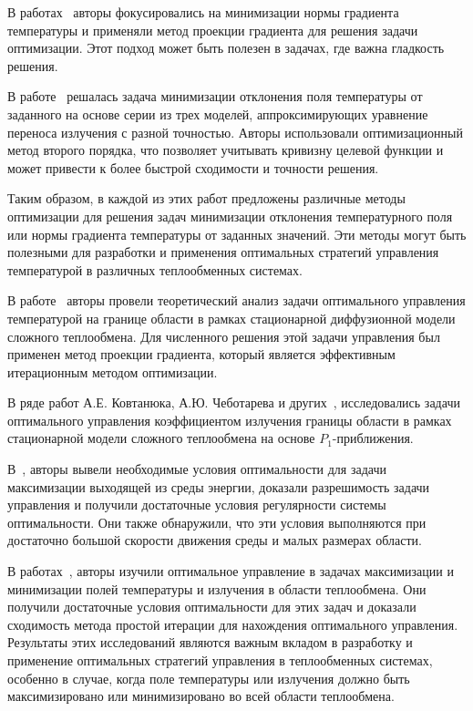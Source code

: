 В работах~\cite{clever2012optimal, Pinnau2013} авторы фокусировались на минимизации
нормы градиента температуры и применяли метод проекции градиента для решения задачи оптимизации.
Этот подход может быть полезен в задачах, где важна гладкость решения.

В работе~\cite{clever2014model} решалась задача минимизации отклонения поля температуры
от заданного на основе серии из трех моделей, аппроксимирующих уравнение переноса излучения с разной точностью.
Авторы использовали оптимизационный метод второго порядка,
что позволяет учитывать кривизну целевой функции и может привести к более быстрой сходимости и точности решения.

Таким образом, в каждой из этих работ предложены различные методы
оптимизации для решения задач минимизации отклонения температурного
поля или нормы градиента температуры от заданных значений.
Эти методы могут быть полезными для разработки и применения оптимальных
стратегий управления температурой в различных теплообменных системах.


В работе~\cite{Kovtanyuk2016Optimal} авторы провели теоретический анализ
задачи оптимального управления температурой на границе области в рамках стационарной
диффузионной модели сложного теплообмена.
Для численного решения этой задачи управления был применен метод проекции
градиента, который является эффективным итерационным методом оптимизации.

В ряде работ А.Е. Ковтанюка, А.Ю. Чеботарева и других~\cite{
Kovtanyuk2014,
astrakhantseva2017design,
Chebotarev2015,
Kovtanyuk2014TheoreticalAnalysis,
}, исследовались задачи оптимального управления коэффициентом
излучения границы области в рамках стационарной модели сложного теплообмена на основе $P_1$-приближения.

В~\cite{Kovtanyuk2014, Kovtanyuk2014TheoreticalAnalysis},
авторы вывели необходимые условия оптимальности для задачи максимизации выходящей
из среды энергии, доказали разрешимость задачи управления и получили
достаточные условия регулярности системы оптимальности.
Они также обнаружили, что эти условия выполняются при достаточно
большой скорости движения среды и малых размерах области.




В работах~\cite{end2011analytical, asllanaj2003existence}, авторы изучили
оптимальное управление в задачах максимизации и минимизации
полей температуры и излучения в области теплообмена.
Они получили достаточные условия оптимальности для этих задач и доказали
сходимость метода простой итерации для нахождения оптимального управления.
Результаты этих исследований являются важным вкладом в разработку и применение
оптимальных стратегий управления в теплообменных системах, особенно в случае,
когда поле температуры или излучения должно быть максимизировано или минимизировано во всей области теплообмена.

